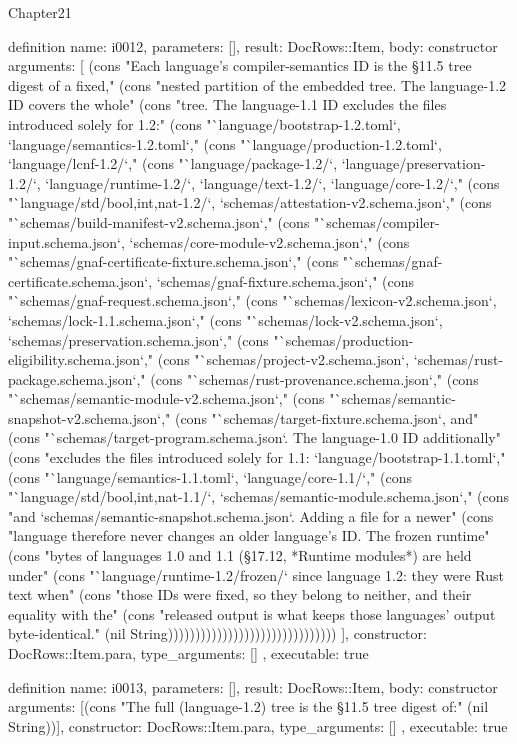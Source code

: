 \begin{lexlean}{Chapter21}
\begin{semanticmodule}
definition{
  name: i0012,
  parameters: [],
  result: DocRows::Item,
  body: constructor{
    arguments: [
      (cons "Each language's compiler-semantics ID is the §11.5 tree digest of a fixed," (cons "nested partition of the embedded tree. The language-1.2 ID covers the whole" (cons "tree. The language-1.1 ID excludes the files introduced solely for 1.2:" (cons "`language/bootstrap-1.2.toml`, `language/semantics-1.2.toml`," (cons "`language/production-1.2.toml`, `language/lcnf-1.2/`," (cons "`language/package-1.2/`, `language/preservation-1.2/`, `language/runtime-1.2/`, `language/text-1.2/`, `language/core-1.2/`," (cons "`language/std/{bool,int,nat}-1.2/`, `schemas/attestation-v2.schema.json`," (cons "`schemas/build-manifest-v2.schema.json`," (cons "`schemas/compiler-input.schema.json`, `schemas/core-module-v2.schema.json`," (cons "`schemas/gnaf-certificate-fixture.schema.json`," (cons "`schemas/gnaf-certificate.schema.json`, `schemas/gnaf-fixture.schema.json`," (cons "`schemas/gnaf-request.schema.json`," (cons "`schemas/lexicon-v2.schema.json`, `schemas/lock-1.1.schema.json`," (cons "`schemas/lock-v2.schema.json`, `schemas/preservation.schema.json`," (cons "`schemas/production-eligibility.schema.json`," (cons "`schemas/project-v2.schema.json`, `schemas/rust-package.schema.json`," (cons "`schemas/rust-provenance.schema.json`," (cons "`schemas/semantic-module-v2.schema.json`," (cons "`schemas/semantic-snapshot-v2.schema.json`," (cons "`schemas/target-fixture.schema.json`, and" (cons "`schemas/target-program.schema.json`. The language-1.0 ID additionally" (cons "excludes the files introduced solely for 1.1: `language/bootstrap-1.1.toml`," (cons "`language/semantics-1.1.toml`, `language/core-1.1/`," (cons "`language/std/{bool,int,nat}-1.1/`, `schemas/semantic-module.schema.json`," (cons "and `schemas/semantic-snapshot.schema.json`. Adding a file for a newer" (cons "language therefore never changes an older language's ID. The frozen runtime" (cons "bytes of languages 1.0 and 1.1 (§17.12, *Runtime modules*) are held under" (cons "`language/runtime-1.2/frozen/` since language 1.2: they were Rust text when" (cons "those IDs were fixed, so they belong to neither, and their equality with the" (cons "released output is what keeps those languages' output byte-identical." (nil String)))))))))))))))))))))))))))))))
    ],
    constructor: DocRows::Item.para,
    type_arguments: []
  },
  executable: true
}

definition{
  name: i0013,
  parameters: [],
  result: DocRows::Item,
  body: constructor{
    arguments: [(cons "The full (language-1.2) tree is the §11.5 tree digest of:" (nil String))],
    constructor: DocRows::Item.para,
    type_arguments: []
  },
  executable: true
}


\end{semanticmodule}
\end{lexlean}
